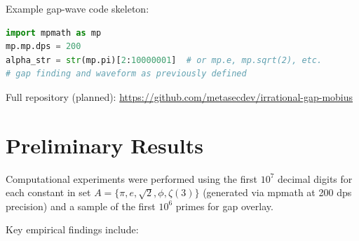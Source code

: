 \documentclass[11pt]{amsart}
\theoremstyle{plain}
\theoremstyle{definition}
\begin{document}
Example gap-wave code skeleton:
\begin{lstlisting}[language=Python]
import mpmath as mp
mp.mp.dps = 200
alpha_str = str(mp.pi)[2:10000001]  # or mp.e, mp.sqrt(2), etc.
# gap finding and waveform as previously defined
\end{lstlisting}
Full repository (planned): \url{https://github.com/metasecdev/irrational-gap-mobius}


\section{Preliminary Results}

Computational experiments were performed using the first $10^7$ decimal digits for each constant in set $A = \{\pi, e, \sqrt{2}, \phi, \zeta(3)\}$ (generated via mpmath at 200 dps precision) and a sample of the first $10^6$ primes for gap overlay.

Key empirical findings include:
\end{document}
